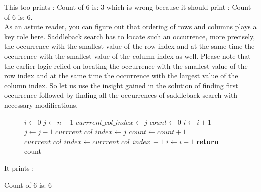 This too prints : Count of 6 is: 3 which is wrong because it should print : Count of 6 is: 6.
\vspace{2mm}\\
As an astute reader, you can figure out that ordering of rows and columns plays a key role here. Saddleback search has to locate such an occurrence, more precisely, the occurrence with the smallest value of the row index and at the same time the occurrence with the smallest value of the column index as well. Please note that the earlier logic relied on locating the occurrence with the smallest value of the row index and at the same time the occurrence with the largest value of the column index. So let us use the insight gained in the solution of finding first occurrence followed by finding all the occurrences of saddleback search with necessary modifications.


\begin{figure}[H]
\begin{center}
\end{center}
\begin{algorithmic}[1]
    \State $i \gets 0$
    \State $j \gets n - 1$
    \State $currrent\_col\_index \gets j$
    \State $count \gets 0$
                \State $i \gets i + 1$
               \State $j \gets j - 1$
               \State $currrent\_col\_index \gets j$
                      \State $count \gets count + 1$
                     \State $currrent\_col\_index \gets currrent\_col\_index\ - 1$
                   \EndWhile
                \State $i \gets i + 1$
            \EndIf
        \EndWhile
        \State \textbf{return} count
\EndFunction
\end{algorithmic}
\end{figure}






It prints :
\begin{boxedverbatim}
Count of 6 is: 6
\end{boxedverbatim}



